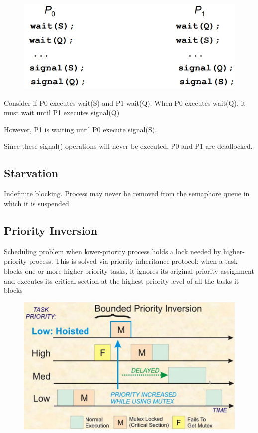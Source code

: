 \begin{figure}[htbp]
    \centering
    \includegraphics[width=0.5\linewidth]{img/witinskdijufb.png}
\end{figure}

Consider if P0 executes wait(S) and P1 wait(Q). When P0 executes
wait(Q), it must wait until P1 executes signal(Q)

However, P1 is waiting until P0 execute signal(S).

Since these signal() operations will never be executed, P0 and P1 are
deadlocked.

\subsection{Starvation}

Indefinite blocking. Process may never be removed from the semaphore queue in
which it is suspended

\subsection{Priority Inversion}

Scheduling problem when lower-priority process holds a lock needed by higher-priority process. This is solved via priority-inheritance protocol: when a task blocks one or more higher-priority tasks, it ignores its
original priority assignment and executes its critical section at the
highest priority level of all the tasks it blocks

\begin{figure}[htbp]
    \centering
    \includegraphics[width=0.5\linewidth]{img/adv.png}
\end{figure}

